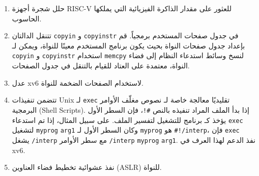 \begin{enumerate}
  \item حلل شجرة أجهزة RISC-V للعثور على مقدار الذاكرة الفيزيائية التي يملكها الحاسوب.
  \item تتنقل الدالتان {\tt copyin} و {\tt copyinstr} في جدول صفحات المستخدم برمجياً. قم بإعداد جدول صفحات النواة بحيث يكون برنامج المستخدم معينًا للنواة، ويمكن لـ {\tt copyin} و {\tt copyinstr} استخدام {\tt memcpy} لنسخ وسائط استدعاء النظام إلى فضاء النواة، معتمدة على العتاد للقيام بالتنقل في جدول الصفحات.
  \item عدل xv6 لاستخدام الصفحات الضخمة للنواة.
  \item تتضمن تنفيذات Unix لـ \lstinline{exec} تقليديًا معالجة خاصة لـ نصوص مغلّف الأوامر البرمجية (Shell Scripts). إذا بدأ الملف المراد تنفيذه بالنص \lstinline{#!}، فإن السطر الأول يؤخذ كـ برنامج للتشغيل لتفسير الملف. على سبيل المثال، إذا تم استدعاء \lstinline{exec} لتشغيل \lstinline{myprog} \lstinline{arg1} وكان السطر الأول لـ \lstinline{myprog} هو \lstinline{#!/interp}، فإن \lstinline{exec} يشغل \lstinline{/interp} مع سطر الأوامر \lstinline{/interp} \lstinline{myprog} \lstinline{arg1}. نفذ الدعم لهذا العرف في xv6.
  \item نفذ عشوائية تخطيط فضاء العناوين (ASLR) للنواة.
\end{enumerate}
